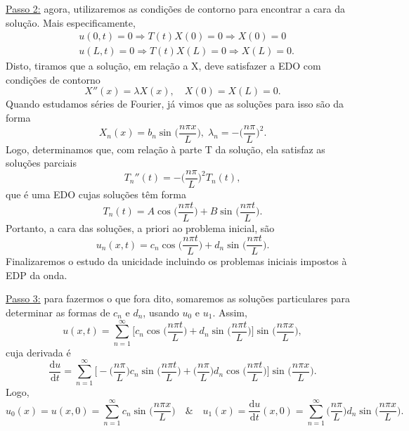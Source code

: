 \documentclass[../pde_notes.tex]{subfiles}
\begin{document}
{\color{IndianRed3}\underline{Passo 2:}} agora, utilizaremos as condições de contorno para encontrar a cara da solução. Mais especificamente,
\begin{align*}
	 & u(0, t) = 0 \Rightarrow T(t)X(0) = 0 \Rightarrow X(0) = 0  \\
	 & u(L, t) = 0 \Rightarrow T(t)X(L) = 0 \Rightarrow X(L) = 0.
\end{align*}
Disto, tiramos que a solução, em relação a X, deve satisfazer a EDO com condições de contorno
\[
	X''(x) = \lambda X(x),\quad X(0) = X(L) = 0.
\]
Quando estudamos séries de Fourier, já vimos que as soluções para isso são da forma
\[
	X_{n}(x) = b_{n}\sin^{}{\biggl(\frac{n\pi x}{L}\biggr)},\; \lambda_{n} = -\biggl(\frac{n\pi }{L}\biggr)^{2}.
\]
Logo, determinamos que, com relação à parte T da solução, ela satisfaz as soluções parciais
\[
	T_{n}''(t) = -\biggl(\frac{n\pi }{L}\biggr)^{2}T_{n}(t),
\]
que é uma EDO cujas soluções têm forma
\[
	T_{n}(t) = A\cos^{}{\biggl(\frac{n\pi t}{L}\biggr)} + B \sin^{}{\biggl(\frac{n\pi t}{L}\biggr)}.
\]
Portanto, a cara das soluções, a priori ao problema inicial, são
\[
	u_{n}(x, t) = c_{n}\cos^{}{\biggl(\frac{n\pi t}{L}\biggr)} + d_{n} \sin^{}{\biggl(\frac{n\pi t}{L}\biggr)}.
\]
Finalizaremos o estudo da unicidade incluindo os problemas iniciais impostos à EDP da onda.

	{\color{RoyalBlue3}\underline{Passo 3:}} para fazermos o que fora dito, somaremos as soluções particulares para determinar as formas de \(c_{n}\) e \(d_{n}\), usando \(u_{0}\) e \(u_{1}\). Assim,
\[
	u(x, t) = \sum\limits_{n=1}^{\infty}\biggl[c_{n}\cos^{}{\biggl(\frac{n\pi t}{L}\biggr)} + d_{n}\sin^{}{\biggl(\frac{n\pi t}{L}\biggr)}\biggr]\sin^{}{\biggl(\frac{n\pi x}{L}\biggr)},
\]
cuja derivada é
\[
	\frac{\mathrm{d}u}{\mathrm{d}t} = \sum\limits_{n=1}^{\infty}\biggl[-\biggl(\frac{n\pi }{L}\biggr)c_{n}\sin^{}{\biggl(\frac{n\pi t}{L}\biggr)} + \biggl(\frac{n\pi }{L}\biggr)d_{n}\cos^{}{\biggl(\frac{n\pi t}{L}\biggr)}\biggr]\sin^{}{\biggl(\frac{n\pi x}{L}\biggr)}.
\]
Logo,
\[
	u_{0}(x) = u(x, 0) = \sum\limits_{n=1}^{\infty}c_{n}\sin^{}{\biggl(\frac{n\pi x}{L}\biggr)} \quad\&\quad u_{1}(x) = \frac{\mathrm{d}u}{\mathrm{d}t}(x, 0) = \sum\limits_{n=1}^{\infty}\biggl(\frac{n\pi }{L}\biggr)d_{n}\sin^{}{\biggl(\frac{n\pi x}{L}\biggr)}.
\]
\end{document}
